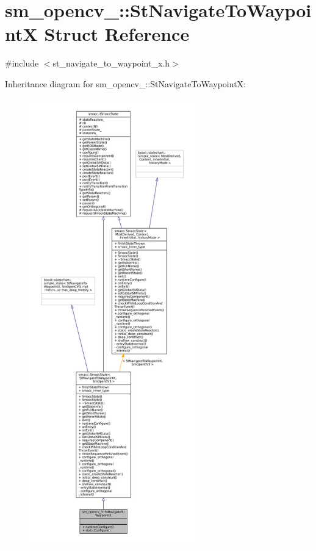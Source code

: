 \hypertarget{structsm__opencv__3_1_1StNavigateToWaypointX}{}\section{sm\+\_\+opencv\+\_\+:\+:St\+Navigate\+To\+WaypointX Struct Reference}
\label{structsm__opencv__3_1_1StNavigateToWaypointX}


{\ttfamily \#include $<$st\+\_\+navigate\+\_\+to\+\_\+waypoint\+\_\+x.\+h$>$}



Inheritance diagram for sm\+\_\+opencv\+\_\+:\+:St\+Navigate\+To\+WaypointX\+:
\nopagebreak
\begin{figure}[H]
\begin{center}
\leavevmode
\includegraphics[height=550pt]{structsm__opencv__3_1_1StNavigateToWaypointX__inherit__graph}
\end{center}
\end{figure}


